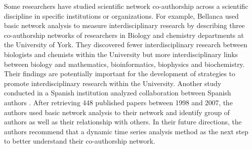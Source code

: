 Some researchers have studied scientific network co-authorship across a scientific discipline in specific institutions or organizations. For example, Bellanca \cite{bellanca_measuring_2009} used basic network analysis to measure interdisciplinary research by describing three co-authorship networks of researchers in Biology and chemistry departments at the University of York. They discovered fewer interdisciplinary research between biologists and chemists within the University but more interdisciplinary links between biology and mathematics, bioinformatics, biophysics and biochemistry. Their findings are potentially important for the development of strategies to promote interdisciplinary research within the University. Another study conducted in a Spanish institution analyzed collaboration between Spanish authors \cite{aleixandre-benavent_coauthorship_2008}. After retrieving 448 published papers between 1998 and 2007, the authors used basic network analysis to their network and identify group of authors as well as their relationship with others. In their future directions, the authors recommend that a dynamic time series analysis method as the next step to better understand their co-authorship network.\\
